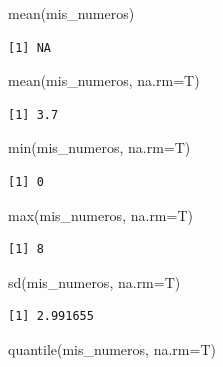 \documentclass[
  letterpaper,
  DIV=11,
  numbers=noendperiod]{scrartcl}
\newenvironment{Shaded}{\begin{snugshade}}{\end{snugshade}}
\newcommand{\AttributeTok}[1]{\textcolor[rgb]{0.40,0.45,0.13}{#1}}
\newcommand{\FunctionTok}[1]{\textcolor[rgb]{0.28,0.35,0.67}{#1}}
\newcommand{\NormalTok}[1]{\textcolor[rgb]{0.00,0.23,0.31}{#1}}
\begin{document}
\begin{Shaded}
\begin{Highlighting}[]
\FunctionTok{mean}\NormalTok{(mis\_numeros) }
\end{Highlighting}
\end{Shaded}

\begin{verbatim}
[1] NA
\end{verbatim}

\begin{Shaded}
\begin{Highlighting}[]
\FunctionTok{mean}\NormalTok{(mis\_numeros, }\AttributeTok{na.rm=}\NormalTok{T) }
\end{Highlighting}
\end{Shaded}

\begin{verbatim}
[1] 3.7
\end{verbatim}

\begin{Shaded}
\begin{Highlighting}[]
\FunctionTok{min}\NormalTok{(mis\_numeros, }\AttributeTok{na.rm=}\NormalTok{T) }
\end{Highlighting}
\end{Shaded}

\begin{verbatim}
[1] 0
\end{verbatim}

\begin{Shaded}
\begin{Highlighting}[]
\FunctionTok{max}\NormalTok{(mis\_numeros, }\AttributeTok{na.rm=}\NormalTok{T) }
\end{Highlighting}
\end{Shaded}

\begin{verbatim}
[1] 8
\end{verbatim}

\begin{Shaded}
\begin{Highlighting}[]
\FunctionTok{sd}\NormalTok{(mis\_numeros, }\AttributeTok{na.rm=}\NormalTok{T) }
\end{Highlighting}
\end{Shaded}

\begin{verbatim}
[1] 2.991655
\end{verbatim}

\begin{Shaded}
\begin{Highlighting}[]
\FunctionTok{quantile}\NormalTok{(mis\_numeros, }\AttributeTok{na.rm=}\NormalTok{T)}
\end{Highlighting}
\end{Shaded}
\end{document}
